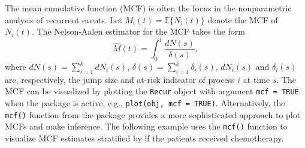 The mean cumulative function (MCF) is often the focus in the
nonparametric analysis of recurrent events. Let
\(M_i(t)=\mathbb{E}\{N_i(t)\}\) denote the MCF of \(N_i(t)\). The
Nelson-Aalen estimator \citep{nelson2003siam} for the MCF takes the form
\[\widehat{M}(t) = \int_0^t \frac{dN(s)}{\delta(s)},\] where
\(dN(s)=\sum_{i=1}^k dN_i(s)\),
\(\delta(s) = \sum_{i=1}^k \delta_i(s)\), \(dN_i(s)\) and
\(\delta_i(s)\) are, respectively, the jump size and at-risk indicator
of process \(i\) at time \(s\). The MCF can be visualized by plotting
the \texttt{Recur} object with argument \texttt{mcf\ =\ TRUE} when the
 package is active, e.g., \texttt{plot(obj,\ mcf\ =\ TRUE)}.
Alternatively, the \texttt{mcf()} function from the  package
provides a more sophisticated approach to plot MCFs and make inference.
The following example uses the \texttt{mcf()} function to visualize MCF
estimates stratified by if the patients received chemotherapy.

\begin{Shaded}
\begin{Highlighting}[]
\StringTok{ }\OperatorTok{::}
 \NormalTok{, } \OperatorTok{:}\NormalTok{) }\OperatorTok{+}
\StringTok{    }\OperatorTok{::}\NormalTok{(} \NormalTok{) }
\end{Highlighting}
\end{Shaded}

